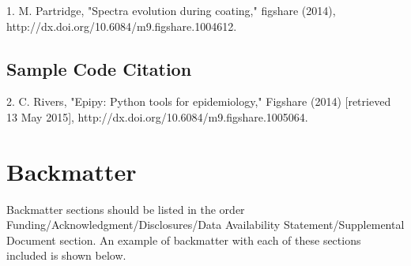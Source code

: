\documentclass[9pt,twocolumn,twoside]{opticajnl}
\begin{document}
1. M. Partridge, "Spectra evolution during coating," figshare (2014), http://dx.doi.org/10.6084/m9.figshare.1004612.

\subsection{Sample Code Citation}

2. C. Rivers, "Epipy: Python tools for epidemiology," Figshare (2014) [retrieved 13 May 2015], http://dx.doi.org/10.6084/m9.figshare.1005064.

\section{Backmatter}
Backmatter sections should be listed in the order Funding/Acknowledgment/Disclosures/Data Availability Statement/Supplemental Document section. An example of backmatter with each of these sections included is shown below.
\end{document}
